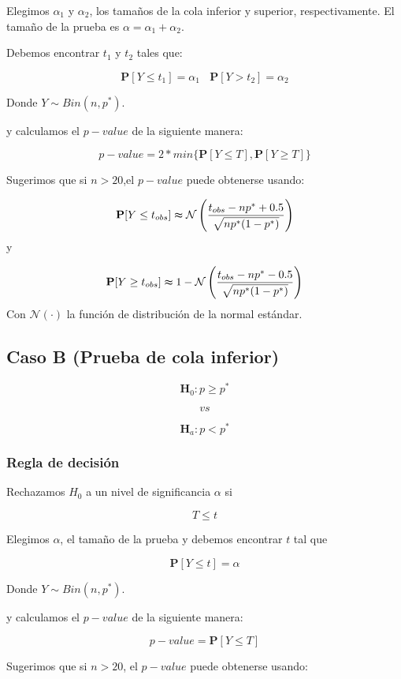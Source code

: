 \documentclass[
  a4paper,
  oneside,
  openany]{book}
\begin{document}
Elegimos \(\alpha_{1}\) y \(\alpha_{2}\), los tamaños de la cola inferior y superior, respectivamente. El tamaño de la prueba es \(\alpha=\alpha_{1}+\alpha_{2}\).

Debemos encontrar \(t_{1}\) y \(t_{2}\) tales que:

\[\mathbf{P}[Y \leq t_{1}]=\alpha_{1} \ \ \ \ \mathbf{P}[Y > t_{2}]=\alpha_{2}\]

Donde \(Y \sim Bin (n,p^*)\).

y calculamos el \(p-value\) de la siguiente manera:

\[p-value=2*min \{ \mathbf{P}[Y\leq T],\mathbf{P}[Y \geq T] \}\]

Sugerimos que si \(n > 20\),el \(p-value\) puede obtenerse usando:

\[\mathbf{P}[Y\leq t_{obs}] \thickapprox \mathcal{N} \left(\frac{t_{obs}-np^*+0.5}{\sqrt{np^*(1-p^*)}}\right)\]
y

\[\mathbf{P}[Y\geq t_{obs}] \thickapprox 1-\mathcal{N} \left(\frac{t_{obs}-np^*-0.5}{\sqrt{np^*(1-p^*)}}\right)\]
Con \(\mathcal{N}(\cdot)\) la función de distribución de la normal estándar.

\hypertarget{caso-b-prueba-de-cola-inferior}{%
\subsection*{Caso B (Prueba de cola inferior)}\label{caso-b-prueba-de-cola-inferior}}


\[\textbf{H}_0: p  \geq p^*\]

\[vs\]

\[\textbf{H}_a: p <p^*\]

\hypertarget{regla-de-decisiuxf3n-1}{%
\subsubsection*{Regla de decisión}\label{regla-de-decisiuxf3n-1}}


Rechazamos \(H_0\) a un nivel de significancia \(\alpha\) si

\[T \leq t\]

Elegimos \(\alpha\), el tamaño de la prueba y debemos encontrar \(t\) tal que

\[\mathbf{P}[Y \leq t]=\alpha\]

Donde \(Y \sim Bin (n,p^*)\).

y calculamos el \(p-value\) de la siguiente manera:

\[p-value= \mathbf{P}[Y\leq T]\]

Sugerimos que si \(n > 20\), el \(p-value\) puede obtenerse usando:
\end{document}
